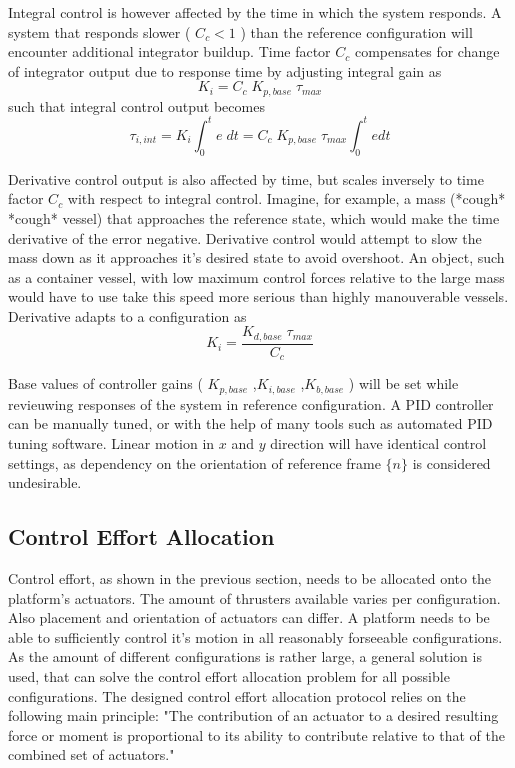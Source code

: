 Integral control is however affected by the time in which the system responds. A system that responds slower ( $C_{c} < 1$ ) than the reference configuration will encounter additional integrator buildup. Time factor $C_{c}$ compensates for change of integrator output due to response time by adjusting integral gain as
\begin{equation}
	K_{i} = C_{c} \; K_{p,base} \; \tau_{max}	
\end{equation} 
such that integral control output becomes
\begin{equation}
\tau_{i,int} =  K_{i} \int_{0}^{t} e \; dt =  C_{c} \; K_{p,base} \; \tau_{max} \int_{0}^{t} e dt
\end{equation}

Derivative control output is also affected by time, but scales inversely to time factor $C_{c}$ with respect to integral control. Imagine, for example, a mass (*cough* *cough* vessel) that approaches the reference state, which would make the time derivative of the error negative. Derivative control would attempt to slow the mass down as it approaches it's desired state to avoid overshoot. An object, such as a container vessel, with low maximum control forces relative to the large mass would have to use take this speed more serious than highly manouverable vessels. Derivative adapts to a configuration as
\begin{equation}
K_{i} = \frac{K_{d,base} \; \tau_{max}}{C_{c}}	
\end{equation} 

Base values of controller gains ( $K_{p,base}$ ,$K_{i,base}$ ,$K_{b,base}$ ) will be set while revieuwing responses of the system in reference configuration. A PID controller can be manually tuned, or with the help of many tools such as automated PID tuning software. Linear motion in $x$ and $y$ direction will have identical control settings, as dependency on the orientation of reference frame $\{n\}$ is considered undesirable. 

\subsection{Control Effort Allocation}
\label{controlEffortAllocationDesign}
Control effort, as shown in the previous section, needs to be allocated onto the platform's actuators. The amount of thrusters available varies per configuration. Also placement and orientation of actuators can differ. 
A platform needs to be able to sufficiently control it's motion in all reasonably forseeable configurations. As the amount of different configurations is rather large, a general solution is used, that can solve the control effort allocation problem for all possible configurations. 
The designed control effort allocation protocol relies on the following main principle:
"The contribution of an actuator to a desired resulting force or moment is proportional to   its ability to contribute relative to that of the combined set of actuators."

